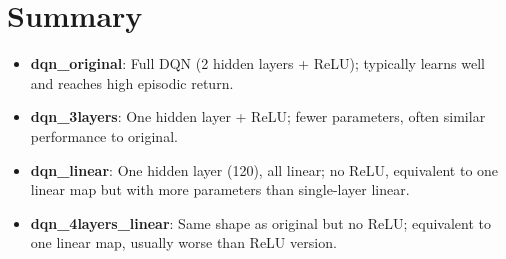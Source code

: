 \documentclass[11pt]{article}
\begin{document}
\section{Summary}

\begin{itemize}
  \item \textbf{dqn\_original}: Full DQN (2 hidden layers + ReLU); typically learns well and reaches high episodic return.
  \item \textbf{dqn\_3layers}: One hidden layer + ReLU; fewer parameters, often similar performance to original.
  \item \textbf{dqn\_linear}: One hidden layer (120), all linear; no ReLU, equivalent to one linear map but with more parameters than single-layer linear.
  \item \textbf{dqn\_4layers\_linear}: Same shape as original but no ReLU; equivalent to one linear map, usually worse than ReLU version.
\end{itemize}
\end{document}
